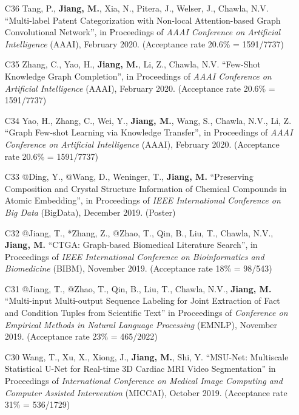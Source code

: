 \documentclass[10pt]{article}
\newenvironment{myindentpar}[1]%
{\begin{list}{}%
         {\setlength{\leftmargin}{#1}}%
         \item[]%
}
{\end{list}}
\newcounter{list}
\begin{document}
\begin{myindentpar}{0.00cm}
\begin{enumerate}[leftmargin=.5cm]
\item[C36] Tang, P., \textbf{Jiang, M.}, Xia, N., Pitera, J., Welser, J., Chawla, N.V. ``Multi-label Patent Categorization with Non-local Attention-based Graph Convolutional Network'', in Proceedings of \textit{AAAI Conference on Artificial Intelligence} (AAAI), February 2020. (Acceptance rate 20.6\% = 1591/7737)
	
\item[C35] Zhang, C., Yao, H., \textbf{Jiang, M.}, Li, Z., Chawla, N.V. ``Few-Shot Knowledge Graph Completion'', in Proceedings of \textit{AAAI Conference on Artificial Intelligence} (AAAI), February 2020. (Acceptance rate 20.6\% = 1591/7737)

\item[C34] Yao, H., Zhang, C., Wei, Y., \textbf{Jiang, M.}, Wang, S., Chawla, N.V., Li, Z. ``Graph Few-shot Learning via Knowledge Transfer'', in Proceedings of \textit{AAAI Conference on Artificial Intelligence} (AAAI), February 2020. (Acceptance rate 20.6\% = 1591/7737)

\item[C33] @Ding, Y., @Wang, D., Weninger, T., \textbf{Jiang, M.} ``Preserving Composition and Crystal Structure Information of Chemical Compounds in Atomic Embedding'', in Proceedings of \textit{IEEE International Conference on Big Data} (BigData), December 2019. (Poster)

\item[C32] @Jiang, T., *Zhang, Z., @Zhao, T., Qin, B., Liu, T., Chawla, N.V., \textbf{Jiang, M.} ``CTGA: Graph-based Biomedical Literature Search'', in Proceedings of \textit{IEEE International Conference on Bioinformatics and Biomedicine} (BIBM), November 2019. (Acceptance rate 18\% = 98/543)

\item[C31] @Jiang, T., @Zhao, T., Qin, B., Liu, T., Chawla, N.V., \textbf{Jiang, M.} ``Multi-input Multi-output Sequence Labeling for Joint Extraction of Fact and Condition Tuples from Scientific Text'' in Proceedings of \textit{Conference on Empirical Methods in Natural Language Processing} (EMNLP), November 2019. (Acceptance rate 23\% = 465/2022)

\item[C30] Wang, T., Xu, X., Xiong, J., \textbf{Jiang, M.}, Shi, Y. ``MSU-Net: Multiscale Statistical U-Net for Real-time 3D Cardiac MRI Video Segmentation'' in Proceedings of \textit{International Conference on Medical Image Computing and Computer Assisted Intervention} (MICCAI), October 2019. (Acceptance rate 31\% = 536/1729)


\end{enumerate}
\end{myindentpar}
\end{document}
